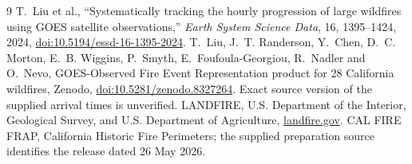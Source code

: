 \begin{thebibliography}{9}
 T.~Liu et al., ``Systematically tracking the hourly progression
of large wildfires using GOES satellite observations,'' \emph{Earth System
Science Data}, 16, 1395--1424, 2024,
\href{https://doi.org/10.5194/essd-16-1395-2024}{doi:10.5194/essd-16-1395-2024}.
 T.~Liu, J.~T. Randerson, Y.~Chen, D.~C. Morton,
E.~B. Wiggins, P.~Smyth, E.~Foufoula-Georgiou, R.~Nadler and O.~Nevo,
GOES-Observed Fire Event Representation product for 28 California wildfires,
Zenodo, \href{https://doi.org/10.5281/zenodo.8327264}{doi:10.5281/zenodo.8327264}.
Exact source version of the supplied arrival times is unverified.
 LANDFIRE, U.S. Department of the Interior, Geological Survey,
and U.S. Department of Agriculture, \href{https://landfire.gov}{landfire.gov}.
 CAL FIRE FRAP, California Historic Fire Perimeters; the supplied
preparation source identifies the release dated 26 May 2026.
\end{thebibliography}
